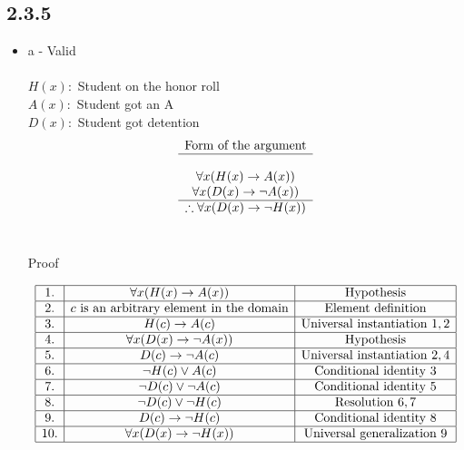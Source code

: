 \documentclass{article}
\begin{document}
\subsection*{2.3.5}
\begin{itemize}
    \item a - Valid \\
    \\
    $H(x):$ Student on the honor roll \\
    $A(x):$ Student got an A \\
    $D(x):$ Student got detention \\

    $$
    \begin{array}{c}
        \text{Form of the argument} \\
        \hline \\
        \forall x(H(x) \rightarrow A(x)) \\
        \forall x(D(x) \rightarrow \neg A(x)) \\
        \hline
        \therefore \forall x(D(x) \rightarrow \neg H(x))
    \end{array}
    $$
    \\

    \begin{center}
    Proof
    \end{center}
    
    $$
    \begin{array}{|c|c|c|}
        \hline
        1. & \forall x(H(x) \rightarrow A(x)) & \text{Hypothesis} \\
        \hline
        2. & c \text{ is an arbitrary element in the domain} & \text{Element definition} \\
        \hline
        3. & H(c) \rightarrow A(c) & \text{Universal instantiation } 1,2 \\
        \hline
        4. & \forall x(D(x) \rightarrow \neg A(x)) & \text{Hypothesis} \\
        \hline
        5. & D(c) \rightarrow \neg A(c) & \text{Universal instantiation } 2,4 \\
        \hline
        6. & \neg H(c) \lor A(c) & \text{Conditional identity } 3 \\
        \hline
        7. & \neg D(c) \lor \neg A(c) & \text{Conditional identity } 5 \\
        \hline
        8. & \neg D(c) \lor \neg H(c) & \text{Resolution } 6,7 \\
        \hline
        9. & D(c) \rightarrow \neg H(c) & \text{Conditional identity } 8 \\
        \hline
        10. & \forall x(D(x) \rightarrow \neg H(x)) & \text{Universal generalization } 9 \\
        \hline
    \end{array}
    $$


\end{itemize}
\end{document}
